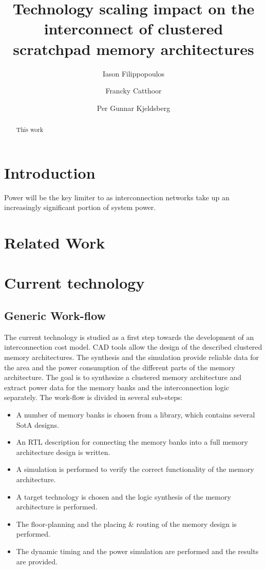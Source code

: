 \documentclass[12pt,a4paper]{article}
\author{Iason Filippopoulos \and Francky Catthoor \and Per Gunnar Kjeldsberg}
\title{Technology scaling impact on the interconnect of clustered scratchpad memory architectures}
\begin{document}
\maketitle

\begin{abstract}
This work
\end{abstract}

\section{Introduction}

Power will be the key limiter to  as interconnection networks take up an increasingly significant portion of system power. 

\section{Related Work}

\section{Current technology}

\subsection{Generic Work-flow}

The current technology is studied as a first step towards the development of an interconnection cost model. 
CAD tools allow the design of the described clustered memory architectures.
The synthesis and the simulation provide reliable data for the area and the power consumption of the different parts of the memory architecture.
The goal is to synthesize a clustered memory architecture and extract power data for the memory banks and the interconnection logic separately.
The work-flow is divided in several sub-steps:

\begin{itemize}
	\item A number of memory banks is chosen from a library, which contains several SotA designs.
	\item An RTL description for connecting the memory banks into a full memory architecture design is written.
	\item A simulation is performed to verify the correct functionality of the memory architecture.
	\item A target technology is chosen and the logic synthesis of the memory architecture is performed.
	\item The floor-planning and the placing \& routing of the memory design is performed.
	\item The dynamic timing and the power simulation are performed and the results are provided.
\end{itemize}
\end{document}
